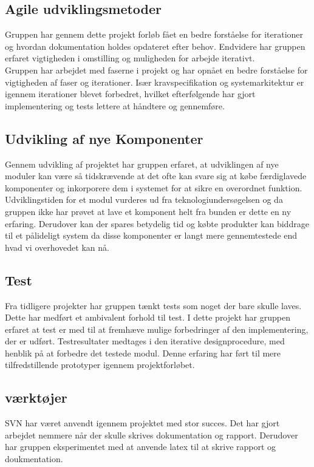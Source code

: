 \subsection{Agile udviklingsmetoder}
Gruppen har gennem dette projekt forløb fået en bedre forståelse for iterationer og hvordan dokumentation holdes opdateret efter behov. Endvidere har gruppen erfaret vigtigheden i omstilling og muligheden for arbejde iterativt.\\
Gruppen har arbejdet med faserne i projekt og har opnået en bedre forståelse for vigtigheden af faser og iterationer. Især kravspecifikation og systemarkitektur er igennem iterationer blevet forbedret, hvilket efterfølgende har gjort implementering og tests lettere at håndtere og gennemføre.\\


\subsection{Udvikling af nye Komponenter}
Gennem udvikling af projektet har gruppen erfaret, at udviklingen af nye moduler kan være så tidskrævende at det ofte kan svare sig at købe færdiglavede komponenter og inkorporere dem i systemet for at sikre en overordnet funktion. Udviklingstiden for et modul vurderes ud fra teknologiundersøgelsen og da gruppen ikke har prøvet at lave et komponent helt fra bunden er dette en ny erfaring. Derudover kan der spares betydelig tid og købte produkter kan biddrage til et pålideligt system da disse komponenter er langt mere gennemtestede end hvad vi overhovedet kan nå.

\subsection{Test}
Fra tidligere projekter har gruppen tænkt tests som noget der bare skulle laves. Dette har medført et ambivalent forhold til test. I dette projekt har gruppen erfaret at test er med til at fremhæve mulige forbedringer af den implementering, der er udført. Testresultater medtages i den iterative designprocedure, med henblik på at forbedre det testede modul. Denne erfaring har ført til mere tilfredstillende prototyper igennem projektforløbet.

\subsection{værktøjer}
SVN har været anvendt igennem projektet med stor succes. Det har gjort arbejdet nemmere når der skulle skrives dokumentation og rapport. Derudover har gruppen eksperimentet med at anvende latex til at skrive rapport og doukmentation.



